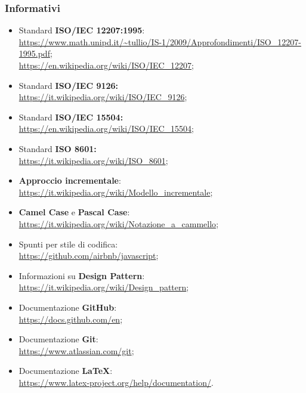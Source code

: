 \subsubsection{Informativi}
\begin{itemize}
\item Standard \textbf{ISO/IEC 12207:1995}:\\ \url{https://www.math.unipd.it/~tullio/IS-1/2009/Approfondimenti/ISO_12207-1995.pdf};\\
\url{https://en.wikipedia.org/wiki/ISO/IEC_12207};
\item Standard \textbf{ISO/IEC 9126: }\\ \url{https://it.wikipedia.org/wiki/ISO/IEC_9126};
\item Standard \textbf{ISO/IEC 15504: }\\ \url{https://en.wikipedia.org/wiki/ISO/IEC_15504};
\item Standard \textbf{ISO 8601: }\\ \url{https://it.wikipedia.org/wiki/ISO_8601};
\item \textbf{Approccio incrementale}:\\ \url{https://it.wikipedia.org/wiki/Modello_incrementale};
\item \textbf{Camel Case} e \textbf{Pascal Case}:\\ \url{https://it.wikipedia.org/wiki/Notazione_a_cammello};
\item Spunti per stile di codifica:\\ \url{https://github.com/airbnb/javascript};
\item Informazioni su \textbf{Design Pattern}:\\ \url{https://it.wikipedia.org/wiki/Design_pattern};
\item Documentazione \textbf{GitHub}:\\ \url{https://docs.github.com/en};
\item Documentazione \textbf{Git}:\\ \url{https://www.atlassian.com/git};
\item Documentazione \textbf{\LaTeX}:\\ \url{https://www.latex-project.org/help/documentation/}.
\end{itemize}
